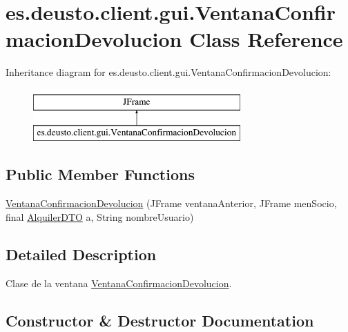 \hypertarget{classes_1_1deusto_1_1client_1_1gui_1_1_ventana_confirmacion_devolucion}{}\section{es.\+deusto.\+client.\+gui.\+Ventana\+Confirmacion\+Devolucion Class Reference}
\label{classes_1_1deusto_1_1client_1_1gui_1_1_ventana_confirmacion_devolucion}
Inheritance diagram for es.\+deusto.\+client.\+gui.\+Ventana\+Confirmacion\+Devolucion\+:\begin{figure}[H]
\begin{center}
\leavevmode
\includegraphics[height=2.000000cm]{classes_1_1deusto_1_1client_1_1gui_1_1_ventana_confirmacion_devolucion}
\end{center}
\end{figure}
\subsection*{Public Member Functions}
\begin{DoxyCompactItemize}
\item 
\mbox{\hyperlink{classes_1_1deusto_1_1client_1_1gui_1_1_ventana_confirmacion_devolucion_a6e50b85483cf56d03729d519be653fb2}{Ventana\+Confirmacion\+Devolucion}} (J\+Frame ventana\+Anterior, J\+Frame men\+Socio, final \mbox{\hyperlink{classes_1_1deusto_1_1server_1_1dto_1_1_alquiler_d_t_o}{Alquiler\+D\+TO}} a, String nombre\+Usuario)
\end{DoxyCompactItemize}


\subsection{Detailed Description}
Clase de la ventana \mbox{\hyperlink{classes_1_1deusto_1_1client_1_1gui_1_1_ventana_confirmacion_devolucion}{Ventana\+Confirmacion\+Devolucion}}. 

\subsection{Constructor \& Destructor Documentation}
\mbox{\label{classes_1_1deusto_1_1client_1_1gui_1_1_ventana_confirmacion_devolucion_a6e50b85483cf56d03729d519be653fb2}} 
